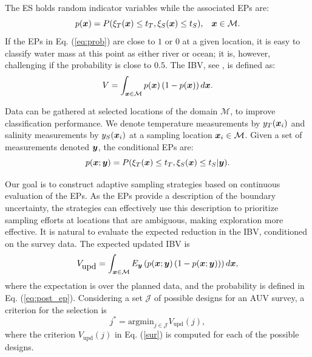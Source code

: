 \documentclass[aoas]{imsart}
\begin{document}
The ES holds random indicator variables while the associated EPs are: 
\begin{equation}\label{eq:prob}
  p(\bx) = P(\xi_T(\bx) \leq t_T, \xi_S(\bx) \leq t_S), \hspace{3mm} \bx \in \mathcal{M}.
\end{equation}
If the EPs in Eq. (\ref{eq:prob}) are
close to $1$ or $0$ at a given location, it is easy to classify water mass at this point as either river or ocean; it is, however,
challenging if the probability is close to $0.5$. 
The IBV, see \cite{bect2019}, is defined as: 
\begin{equation}\label{measVAR}
    V = \int_{\bx \in \mathcal{M}} p(\bx) \left(1-p(\bx)\right) d\bx.
\end{equation}

Data can be
gathered at selected locations of the domain $\mathcal{M}$, to improve
classification performance. We denote temperature measurements by
$y_{T}({\boldsymbol x}_i)$ and salinity measurements by $y_{S}({\boldsymbol x}_i)$ at a
sampling location ${\boldsymbol x}_i \in \mathcal{M}$. Given a set of
measurements denoted ${\boldsymbol y}$, the conditional EPs are:
\begin{equation}\label{eq:post_ep}
 p(\bx;\by) = P(\xi_T(\bx) \leq t_T, \xi_S(\bx) \leq t_S |\by). 
\end{equation}

Our goal is to construct adaptive sampling strategies based on continuous evaluation of the EPs. As the EPs provide a description of the boundary uncertainty, the strategies can effectively use this description to prioritize sampling efforts at locations that are ambiguous, making exploration more effective. It is natural to evaluate the expected reduction in the IBV, conditioned on the survey data. The expected updated IBV is
\begin{equation}\label{sur}
    V_{\mbox{upd}} = \int_{\bx \in \mathcal{M}} E_{\by} \left( p(\bx;\by)\left( 1-p(\bx;\by)\right) \right) d\bx, 
\end{equation}
where the expectation is over the planned data, and the probability is defined in Eq. (\ref{eq:post_ep}).
Considering a set $\mathcal{J}$ of possible designs for an AUV survey, a criterion for the selection is
\begin{equation}\label{crit}
    j^* = \mbox{argmin}_{j \in \mathcal{J}} V_{\mbox{upd}}(j),
\end{equation}
where the criterion $V_{\mbox{upd}}(j)$ in Eq. (\ref{sur}) is computed
for each of the possible designs. 
\end{document}
